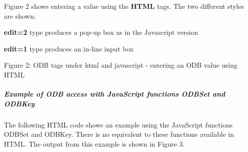 Figure 2 shows entering a value using the {\bfseries HTML} tags. The two different styles are shown.
\begin{DoxyItemize}
\item {\bfseries edit=2} type produces a pop-\/up box as in the Javascript version
\item {\bfseries edit=1} type produces an in-\/line input box
\end{DoxyItemize}

\par
\par
\par
 \begin{center} Figure 2: ODB tags under html and javascript -\/ entering an ODB value using HTML \par
\par
\par
  \par
\par
\par
 \end{center} \hypertarget{RC_mhttpd_custom_ODB_access_examples_RC_mhttpd_js_example2}{}\subparagraph{Example of ODB access with JavaScript functions ODBSet and ODBKey}\label{RC_mhttpd_custom_ODB_access_examples_RC_mhttpd_js_example2}
The following HTML code shows an example using the JavaScript functions ODBSet and ODBKey. There is no equivalent to these functions available in HTML. The output from this example is shown in Figure 3.


